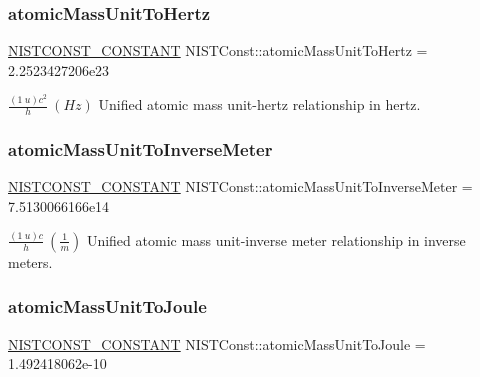 \subsubsection{\texorpdfstring{atomic\+Mass\+Unit\+To\+Hertz}{atomicMassUnitToHertz}}
{\footnotesize\ttfamily \mbox{\hyperlink{_n_i_s_t_const_8hpp_a2b0fc1d7452373f816175dd86ce26729}{N\+I\+S\+T\+C\+O\+N\+S\+T\+\_\+\+C\+O\+N\+S\+T\+A\+NT}} N\+I\+S\+T\+Const\+::atomic\+Mass\+Unit\+To\+Hertz = 2.\+2523427206e23}

$\frac{(1\ u)c^2}{h} \ (Hz)$ Unified atomic mass unit-\/hertz relationship in hertz. \mbox{\label{group___n_i_s_t_const-_atomic_mass_unit_gaa66e75563e7a7c28bc3c4b5c4ab482a1}} 
\subsubsection{\texorpdfstring{atomic\+Mass\+Unit\+To\+Inverse\+Meter}{atomicMassUnitToInverseMeter}}
{\footnotesize\ttfamily \mbox{\hyperlink{_n_i_s_t_const_8hpp_a2b0fc1d7452373f816175dd86ce26729}{N\+I\+S\+T\+C\+O\+N\+S\+T\+\_\+\+C\+O\+N\+S\+T\+A\+NT}} N\+I\+S\+T\+Const\+::atomic\+Mass\+Unit\+To\+Inverse\+Meter = 7.\+5130066166e14}

$\frac{(1\ u)c}{h} \ (\frac{1}{m})$ Unified atomic mass unit-\/inverse meter relationship in inverse meters. \mbox{\label{group___n_i_s_t_const-_atomic_mass_unit_ga8c1405e0299d1388f1452bf4e04778f9}} 
\subsubsection{\texorpdfstring{atomic\+Mass\+Unit\+To\+Joule}{atomicMassUnitToJoule}}
{\footnotesize\ttfamily \mbox{\hyperlink{_n_i_s_t_const_8hpp_a2b0fc1d7452373f816175dd86ce26729}{N\+I\+S\+T\+C\+O\+N\+S\+T\+\_\+\+C\+O\+N\+S\+T\+A\+NT}} N\+I\+S\+T\+Const\+::atomic\+Mass\+Unit\+To\+Joule = 1.\+492418062e-\/10}


